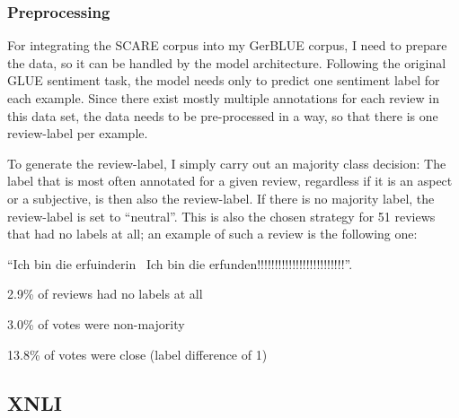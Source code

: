 \subsubsection{Preprocessing}

For integrating the SCARE corpus into my GerBLUE corpus, I need to prepare the data, so it can be handled by the model architecture.
Following the original GLUE sentiment task, the model needs only to predict one sentiment label for each example.
Since there exist mostly multiple annotations for each review in this data set, the data needs to be pre-processed in a way, so that there is one review-label per example.

To generate the review-label, I simply carry out an majority class decision:
The label that is most often annotated for a given review, regardless if it is an aspect or a subjective, is then also the review-label.
If there is no majority label, the review-label is set to ``neutral''.
This is also the chosen strategy for 51 reviews that had no labels at all; an example of such a review is the following one: 

\begin{examples}
	\item ``Ich bin die erfuinderin \textbar \textbar\ Ich bin die erfunden!!!!!!!!!!!!!!!!!!!!!!!!!''.
\end{examples}

2.9\% of reviews had no labels at all 

3.0\% of votes were non-majority

13.8\% of votes were close (label difference of 1)

\subsection{XNLI}

\cite{conneau2018xnli}


